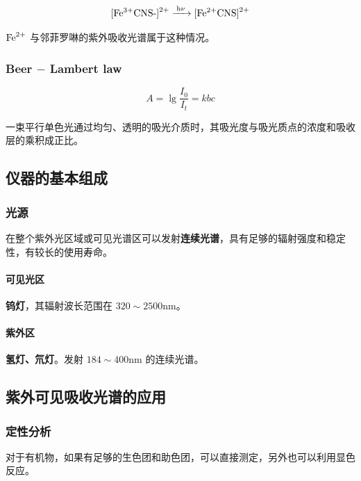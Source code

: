 \begin{equation}
    \ce{{[Fe^{3+}CNS-]}^{2+} ->[h\nu] {[Fe^{2+}CNS]}^{2+}}
\end{equation}

$\ce{Fe^{2+}}$ 与邻菲罗啉的紫外吸收光谱属于这种情况。

\subsubsection{Beer $-$ Lambert law}

\begin{equation}
    A = \lg \frac{I_0}{I_t} = kbc
\end{equation}

一束平行单色光通过均匀、透明的吸光介质时，其吸光度与吸光质点的浓度和吸收层的乘积成正比。

\subsection{仪器的基本组成}

\subsubsection{光源}

在整个紫外光区域或可见光谱区可以发射\textbf{连续光谱}，具有足够的辐射强度和稳定
性，有较长的使用寿命。

\paragraph{可见光区} \textbf{钨灯}，其辐射波长范围在 $320 \sim 2500 \mathrm{nm}$。

\paragraph{紫外区} \textbf{氢灯、氘灯}。发射 $184 \sim 400 \mathrm{nm}$ 的连续光谱。

\subsection{紫外可见吸收光谱的应用}

\subsubsection{定性分析}

对于有机物，如果有足够的生色团和助色团，可以直接测定，另外也可以利用显色反应。

